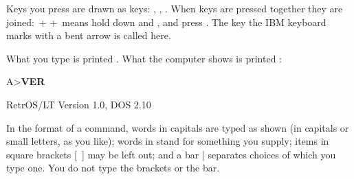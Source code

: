 Keys you press are drawn as keys: , , . When keys
are pressed together they are joined: \,+\,\,+\,
means hold down  and , and press . The key
the IBM keyboard marks with a bent arrow is called  here.

What you type is printed . What the computer shows is
printed :

\begin{dialogue}
A>\textbf{VER}

RetrOS/LT Version 1.0, DOS 2.10
\end{dialogue}

In the format of a command, words in capitals are typed as shown (in
capitals or small letters, as you like); words in  stand for
something you supply; items in square brackets [\ ] may be left out; and a
bar | separates choices of which you type one. You do not type the
brackets or the bar.



\mwnewpart
\renewcommand\runningtitle{Contents}
\renewcommand\contentsname{Contents}
\tableofcontents
